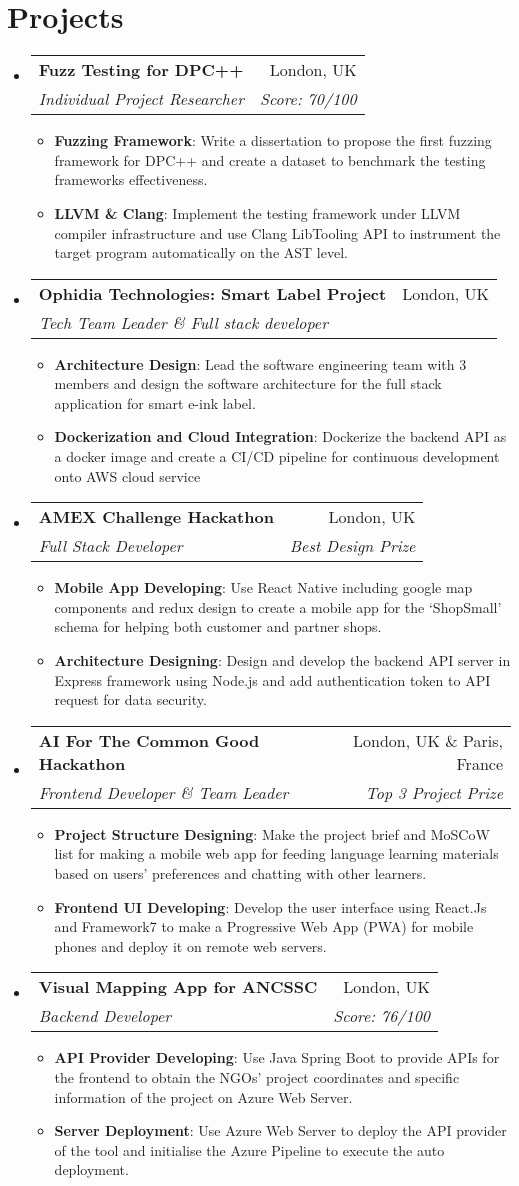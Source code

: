 \documentclass[letterpaper,11pt]{article}
\makeatletter
\newcommand{\resumeItem}[2]{
  \item\small{
    \textbf{#1}{: #2 \vspace{-2pt}}
  }
}
\newcommand{\resumeSubheading}[4]{
  \vspace{-1pt}\item
    \begin{tabular*}{0.97\textwidth}[t]{l@{\extracolsep{\fill}}r}
      \textbf{#1} & #2 \\
      \textit{\small#3} & \textit{\small #4} \\
    \end{tabular*}\vspace{-5pt}
}
\newcommand{\resumeSubHeadingListStart}{\begin{itemize}[leftmargin=*]}
\newcommand{\resumeSubHeadingListEnd}{\end{itemize}}
\newcommand{\resumeItemListStart}{\begin{itemize}}
\newcommand{\resumeItemListEnd}{\end{itemize}\vspace{-5pt}}
\makeatother
\begin{document}
\section{Projects}
  \resumeSubHeadingListStart
    \resumeSubheading
    {Fuzz Testing for DPC++}{London, UK}
    {Individual Project Researcher}{Score: 70/100}
    \resumeItemListStart
      \resumeItem{Fuzzing Framework}
          {Write a dissertation to propose the first fuzzing framework for DPC++ and create a dataset to benchmark the testing frameworks effectiveness.}
      \resumeItem{LLVM \& Clang}
          {Implement the testing framework under LLVM compiler infrastructure and use Clang LibTooling API to instrument the target program automatically on the AST level.}
    \resumeItemListEnd
    \resumeSubheading
    {Ophidia Technologies: Smart Label Project}{London, UK}
    {Tech Team Leader \& Full stack developer}{}
    \resumeItemListStart
      \resumeItem{Architecture Design}
          {Lead the software engineering team with 3 members and design the software architecture for the full stack application for smart e-ink label.}
      \resumeItem{Dockerization and Cloud Integration}
          {Dockerize the backend API as a docker image and create a CI/CD pipeline for continuous development onto AWS cloud service}
    \resumeItemListEnd
    \resumeSubheading
    {AMEX Challenge Hackathon}{London, UK}
    {Full Stack Developer}{Best Design Prize}
    \resumeItemListStart
      \resumeItem{Mobile App Developing}
          {Use React Native including google map components and redux design to create a mobile app 
          for the `ShopSmall' schema for helping both customer and partner shops.}
      \resumeItem{Architecture Designing}
          {Design and develop the backend API server in Express framework using Node.js and 
          add authentication token to API request for data security.}
    \resumeItemListEnd

    \resumeSubheading
    {AI For The Common Good Hackathon}{London, UK \& Paris, France}
    {Frontend Developer \& Team Leader}{Top 3 Project Prize}
    \resumeItemListStart
      \resumeItem{Project Structure Designing}
          {Make the project brief and MoSCoW list for making a mobile web app for feeding language learning materials based on users' preferences and chatting with other learners.}
      \resumeItem{Frontend UI Developing}
          {Develop the user interface using React.Js and Framework7
          to make a Progressive Web App (PWA) for mobile phones and deploy it on remote web servers.}
    \resumeItemListEnd

    \resumeSubheading
    {Visual Mapping App for ANCSSC}{London, UK}
    {Backend Developer}{Score: 76/100}
    \resumeItemListStart
      \resumeItem{API Provider Developing}
          {Use Java Spring Boot to provide APIs for the frontend to obtain the NGOs' project coordinates and 
          specific information of the project on Azure Web Server.}
      \resumeItem{Server Deployment}
          {Use Azure Web Server to deploy the API provider of the tool and initialise the Azure Pipeline to
           execute the auto deployment.}
    \resumeItemListEnd
  \resumeSubHeadingListEnd

\end{document}

